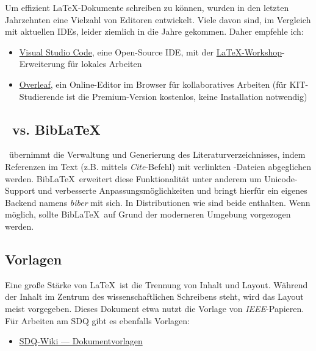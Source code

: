 Um effizient \LaTeX-Dokumente schreiben zu können, wurden in den letzten Jahrzehnten eine Vielzahl von Editoren entwickelt. Viele davon sind, im Vergleich mit aktuellen IDEs, leider ziemlich in die Jahre gekommen. Daher empfehle ich:

\smallskip
\begin{itemize}[label={\symbolTool}]
    \item \href{https://code.visualstudio.com/}{Visual Studio Code}, eine Open-Source IDE, mit der \href{https://marketplace.visualstudio.com/items?itemName=James-Yu.latex-workshop}{LaTeX-Workshop}-Erweiterung für lokales Arbeiten
    \item \href{https://overleaf.com/}{Overleaf}, ein Online-Editor im Browser für kollaboratives Arbeiten (für KIT-Studierende ist die Premium-Version kostenlos, keine Installation notwendig)
\end{itemize}
\smallskip

\subsection{\bibtex\ vs. Bib\LaTeX}%
\label{sec:Schreiben:Bibtex}

\bibtex\ übernimmt die Verwaltung und Generierung des Literaturverzeichnisses, indem Referenzen im Text (z.B. mittels \emph{Cite}-Befehl) mit verlinkten -Dateien abgeglichen werden.
Bib\LaTeX\ erweitert diese Funktionalität unter anderem um Unicode-Support und verbesserte Anpassungsmöglichkeiten und bringt hierfür ein eigenes Backend namens \emph{biber} mit sich.
In Distributionen wie  sind beide enthalten.
Wenn möglich, sollte Bib\LaTeX\ auf Grund der moderneren Umgebung vorgezogen werden.

\subsection{Vorlagen}%
\label{sec:Schreiben:Vorlagen}

Eine große Stärke von \LaTeX\ ist die Trennung von Inhalt und Layout.
Während der Inhalt im Zentrum des wissenschaftlichen Schreibens steht, wird das Layout meist vorgegeben.
Dieses Dokument etwa nutzt die Vorlage von \emph{IEEE}-Papieren. Für Arbeiten am SDQ gibt es ebenfalls Vorlagen:

\smallskip
\begin{itemize}[label={\symbolInfo}]
    \item \href{https://sdqweb.ipd.kit.edu/wiki/Dokumentvorlagen}{SDQ-Wiki --- Dokumentvorlagen}
\end{itemize}


